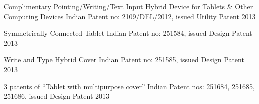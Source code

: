 

\begin{cvhonors}

  \cvhonor
    {Complimentary Pointing/Writing/Text Input Hybrid Device for Tablets \& Other Computing Devices} %
    {Indian Patent no: 2109/DEL/2012, issued} %
    {Utility Patent} %
    {2013} %


  \cvhonor
    {Symmetrically Connected Tablet} %
    {Indian Patent no: 251584, issued} %
    {Design Patent} %
    {2013} %

  \cvhonor
    {Write and Type Hybrid Cover} %
    {Indian Patent no: 251585, issued} %
    {Design Patent} %
    {2013} %

    
  \cvhonor
    {3 patents of ``Tablet with multipurpose cover''} %
    {Indian Patent nos: 251684, 251685, 251686, issued}   %
    {Design Patent} %
    {2013} %

\end{cvhonors}
